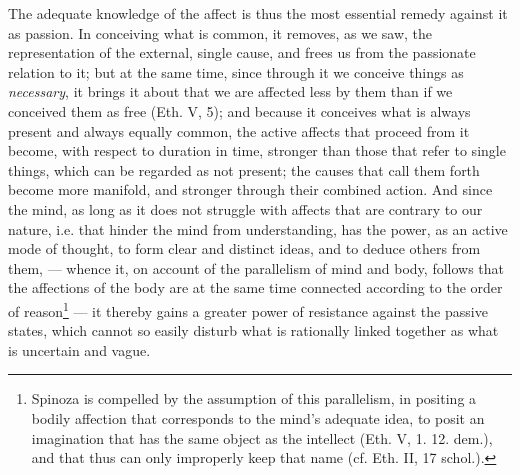 \documentclass[12pt,a4paper,openany]{book}
\newcommand{\opage}[1]{\marginnote{\footnotesize\textit{[#1]}}}
\begin{document}
The adequate knowledge of the affect is thus the
most essential remedy against it as passion. In conceiving
what is common, it removes, as we saw, the representation
of the external, single cause, and frees us from the
\opage{164}\setcounter{footnote}{0}passionate relation to it; but at the same time, since
through it we conceive things as \emph{necessary}, it brings it about that we are affected
less by them than if we conceived them as free
(Eth. V, 5); and because it conceives what is always present
and always equally common, the active affects that proceed
from it become, with respect to duration in time, stronger than those
that refer to single things, which can be regarded as
not present; the causes that call them forth become
more manifold, and stronger through their combined action. And since
the mind, as long as it does not struggle with affects that are
contrary to our nature, i.e. that hinder the mind from understanding,
has the power, as an active mode of thought, to form clear and
distinct ideas, and to deduce others from them, --- whence it,
on account of the parallelism of mind and body, follows that
the affections of the body are at the same time connected according to the order
of reason\footnote{Spinoza is compelled by the assumption of this parallelism, in positing
a bodily affection that corresponds to the mind's adequate idea,
to posit an imagination that has the same object as the intellect
(Eth. V, 1. 12. dem.), and that thus can only improperly keep
that name (cf. Eth. II, 17 schol.).} --- it thereby gains a greater power of resistance
against the passive states, which cannot so easily
disturb what is rationally linked together as what is uncertain
and vague.
\end{document}
